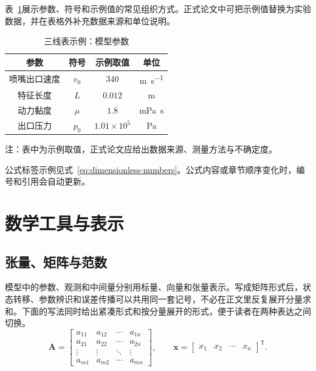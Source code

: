 表~\ref{tab:parameters}展示参数、符号和示例值的常见组织方式。正式论文中可把示例值替换为实验数据，并在表格外补充数据来源和单位说明。
\begin{table}[htbp]
  \centering
  \caption{三线表示例：模型参数}
  \label{tab:parameters}
  \begin{tabular}{cccc}
    \toprule
    \textbf{参数} & \textbf{符号} & \textbf{示例取值} & \textbf{单位}\\
    \midrule
    喷嘴出口速度 & $v_0$ & $340$ & \si{\meter\per\second}\\
    特征长度 & $L$ & $0.012$ & \si{\meter}\\
    动力黏度 & $\mu$ & $1.8$ & \si{\milli\pascal\second}\\
    出口压力 & $p_0$ & $1.01\times10^5$ & \si{\pascal}\\
    \bottomrule
  \end{tabular}

  \smallskip
  \begin{minipage}{0.88\textwidth}\footnotesize
    注：表中为示例取值，正式论文应给出数据来源、测量方法与不确定度。
  \end{minipage}
\end{table}

公式标签示例见式~\eqref{eq:dimensionless-numbers}。公式内容或章节顺序变化时，编号和引用会自动更新。

\section{数学工具与表示}

\subsection{张量、矩阵与范数}

模型中的参数、观测和中间量分别用标量、向量和张量表示。写成矩阵形式后，状态转移、参数辨识和误差传播可以共用同一套记号，不必在正文里反复展开分量求和。下面的写法同时给出紧凑形式和按分量展开的形式，便于读者在两种表达之间切换。
\begin{equation}
  \bm{A}=
  \begin{bmatrix}
    a_{11}&a_{12}&\cdots&a_{1n}\\
    a_{21}&a_{22}&\cdots&a_{2n}\\
    \vdots&\vdots&\ddots&\vdots\\
    a_{m1}&a_{m2}&\cdots&a_{mn}
  \end{bmatrix},
  \qquad
  \bm{x}=
  \begin{bmatrix}x_1&x_2&\cdots&x_n\end{bmatrix}^{\mathsf T}.
  \label{eq:matrix-vector}
\end{equation}

